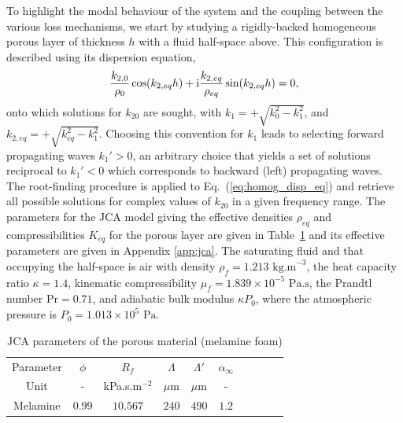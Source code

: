 To highlight the modal behaviour of the system and the coupling between the various loss mechanisms, we start by studying a rigidly-backed homogeneous porous layer of thickness $h$ with a fluid half-space above. This configuration is described using its dispersion equation, 
\begin{equation}
    \frac{k_{2,0}}{\rho_0} \cos(k_{2,eq}h) + \mathrm i \frac{k_{2,eq}}{\rho_{eq}} \sin(k_{2,eq}h) = 0, 
    \label{eq:homog_disp_eq}
\end{equation}
onto which solutions for $k_{20}$ are sought, with $k_1 = + \sqrt{k_{0}^2 - k_1^2}$, and $k_{2,eq} = + \sqrt{k_{eq}^2 - k_1^2}$. Choosing this convention for $k_1$ leads to selecting forward propagating waves $k_1' > 0$, an arbitrary choice that yields a set of solutions reciprocal to $k_1' < 0$ which corresponds to backward (left) propagating waves. The root-finding procedure is applied to Eq.~(\ref{eq:homog_disp_eq}) and retrieve all possible solutions for complex values of $k_{20}$ in a given frequency range. The parameters for the JCA model giving the effective densities $\rho_{eq}$ and compressibilities $K_{eq}$ for the porous layer are given in Table~\ref{tab:poroelastic_params} and its effective parameters are given in Appendix \ref{app:jca}. The saturating fluid and that occupying the half-space is air with density $\rho_f = 1.213\textrm{ kg.m}^{-3}$, the heat capacity ratio $\kappa = 1.4$, kinematic compressibility $\mu_f = 1.839 \times 10^{-5} \textrm{ Pa.s}$, the Prandtl number $\textrm{Pr} = 0.71$, and adiabatic bulk modulus $\kappa P_0$, where the atmospheric pressure is $P_0 = 1.013 \times 10^5 \textrm{ Pa}$.
\begin{table}[htpb]
        \centering
             \caption{JCA parameters of the porous material (melamine foam)}
        \label{tab:poroelastic_params}

            \begin{tabular}{cccccccccc}
            \hline
            \hline
            Parameter  & $\phi$ & $R_f$ & $\Lambda$ & $\Lambda'$ & $\alpha_\infty$   \\
            Unit       & -      & kPa.s.m$^{-2}$ & $\mu$m    & $\mu$m     & -        \\
            \hline
            Melamine   & $0.99$ & $10.567$          & $240$     & $490$      & $1.2$ \\
            \hline
            \hline
        \end{tabular}\\[2em]        
        \end{table}

